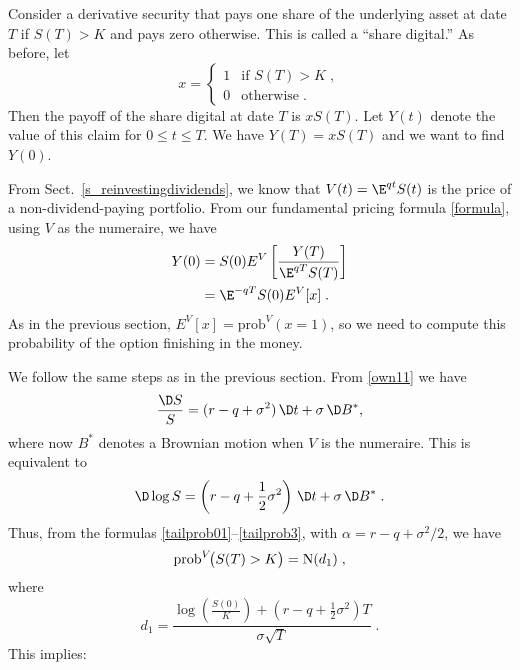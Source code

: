 Consider a derivative security that pays one share of the underlying asset at date $T$ if $S(T)>K$ and pays zero otherwise.  This is called a ``share digital.''  As before, let
\begin{equation*}
x =  \begin{cases} 1 & \text{if $S(T)>K$}\; ,\\
0 & \text{otherwise}\;.
\end{cases}
\end{equation*}
Then the payoff of the share digital at date $T$ is $xS(T)$.  Let $Y(t)$ denote the value of this claim for $0\leq t\leq T$.  We have $Y(T)=xS(T)$ and we want to find $Y(0)$.  

From Sect.~\ref{s_reinvestingdividends}, we know that $V(t)=\E^{qt}S(t)$ is the price of a non-dividend-paying portfolio.  From our fundamental pricing formula \eqref{formula}, using $V$ as the numeraire, we have
\begin{align*}
Y(0) &= S(0) E^V \left[\frac{Y(T)}{\E^{q T}S(T)}\right]\\
&=\E^{-q T}S(0)E^V [x]\;.
\end{align*}
As in the previous section, $E^V[x] = \text{prob}^V\!(x=1)$, so we need to compute this probability of the option finishing in the money.  

We follow the same steps as in the previous section.  From  \eqref{own11} we have
$$
\frac{\D S}{S} = (r-q+ \sigma^2)\,\D t+\sigma\,\D B^*,
$$
where now $B^*$ denotes a Brownian motion when $V$ is the numeraire.  This is equivalent to
\begin{equation}\label{new5}
\D \log S = \left(r-q+\frac{1}{2}\sigma^2\right)\,\D t + \sigma \,\D B^*\;.
\end{equation}
Thus, from the formulas \eqref{tailprob01}--\eqref{tailprob3}, with $\alpha = r-q+\sigma^2/2$, we have 
$$\text{prob}^V\!\big(S(T)>K\big) = \operatorname{N}(d_1)\; ,$$
where
\begin{equation}\label{sharedigital_d1}
d_1 = \frac{\log\left(\frac{S(0)}{K}\right)+\left(r-q+\frac{1}{2}\sigma^2\right)T}{\sigma\sqrt{T}}\;.
\end{equation}
This implies:

